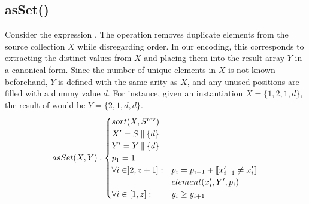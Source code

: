 \newpage
\subsection{asSet()}
\smallskip
\noindent
\label{ssec:asSet}
Consider the expression . The  operation removes duplicate elements from the source collection $X$ while disregarding order. In our encoding, this corresponds to extracting the distinct values from $X$ and placing them into the result array $Y$ in a canonical form. Since the number of unique elements in $X$ is not known beforehand, $Y$ is defined with the same arity as $X$, and any unused positions are filled with a dummy value $d$. For instance, given an instantiation $X=\{1,2,1,d\}$, the result of  would be $Y=\{2,1,d,d\}$. 
% 
\begin{equation}\label{csp:set_XY}
asSet(X,Y) :
\begin{cases} 
sort(X,S^{\text{rev}}) \\
X' = S \mathbin{\|} \{d\} \\
Y' = Y \mathbin{\|} \{d\} \\
p_1=1\\
\forall i \in ]2,z+1] :& p_i=p_{i-1}+ \llbracket x'_{i-1} \neq x'_i \rrbracket \\
&element(x'_i,Y',p_i)\\
\forall i \in [1,z] :  &y_i \geq y_{i+1}\\
\end{cases}
\end{equation}
